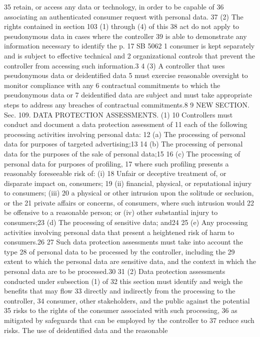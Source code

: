 35 retain, or access any data or technology, in order to be capable of
36 associating an authenticated consumer request with personal data.
37 (2) The rights contained in section 103 (1) through (4) of this
38 act do not apply to pseudonymous data in cases where the controller
39 is able to demonstrate any information necessary to identify the
p. 17 SB 5062
1 consumer is kept separately and is subject to effective technical and
2 organizational controls that prevent the controller from accessing
such information.3
4 (3) A controller that uses pseudonymous data or deidentified data
5 must exercise reasonable oversight to monitor compliance with any
6 contractual commitments to which the pseudonymous data or
7 deidentified data are subject and must take appropriate steps to
address any breaches of contractual commitments.8
9 NEW SECTION. Sec. 109. DATA PROTECTION ASSESSMENTS. (1)
10 Controllers must conduct and document a data protection assessment of
11 each of the following processing activities involving personal data:
12 (a) The processing of personal data for purposes of targeted
advertising;13
14 (b) The processing of personal data for the purposes of the sale
of personal data;15
16 (c) The processing of personal data for purposes of profiling,
17 where such profiling presents a reasonably foreseeable risk of: (i)
18 Unfair or deceptive treatment of, or disparate impact on, consumers;
19 (ii) financial, physical, or reputational injury to consumers; (iii)
20 a physical or other intrusion upon the solitude or seclusion, or the
21 private affairs or concerns, of consumers, where such intrusion would
22 be offensive to a reasonable person; or (iv) other substantial injury
to consumers;23
(d) The processing of sensitive data; and24
25 (e) Any processing activities involving personal data that
present a heightened risk of harm to consumers.26
27 Such data protection assessments must take into account the type
28 of personal data to be processed by the controller, including the
29 extent to which the personal data are sensitive data, and the context
in which the personal data are to be processed.30
31 (2) Data protection assessments conducted under subsection (1) of
32 this section must identify and weigh the benefits that may flow
33 directly and indirectly from the processing to the controller,
34 consumer, other stakeholders, and the public against the potential
35 risks to the rights of the consumer associated with such processing,
36 as mitigated by safeguards that can be employed by the controller to
37 reduce such risks. The use of deidentified data and the reasonable
